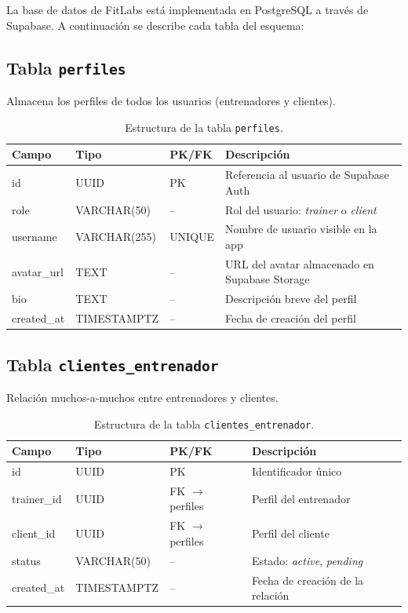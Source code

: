 La base de datos de FitLabs está implementada en PostgreSQL a través de Supabase. A continuación se describe cada tabla del esquema:

\subsection{Tabla \texttt{perfiles}}

Almacena los perfiles de todos los usuarios (entrenadores y clientes).

\begin{table}[H]
\centering
\begin{tabular}{@{}llll@{}}
\toprule
\textbf{Campo} & \textbf{Tipo} & \textbf{PK/FK} & \textbf{Descripción} \\
\midrule
id & UUID & PK & Referencia al usuario de Supabase Auth \\
role & VARCHAR(50) & -- & Rol del usuario: \textit{trainer} o \textit{client} \\
username & VARCHAR(255) & UNIQUE & Nombre de usuario visible en la app \\
avatar\_url & TEXT & -- & URL del avatar almacenado en Supabase Storage \\
bio & TEXT & -- & Descripción breve del perfil \\
created\_at & TIMESTAMPTZ & -- & Fecha de creación del perfil \\
\bottomrule
\end{tabular}
\caption{Estructura de la tabla \texttt{perfiles}.}
\end{table}

\subsection{Tabla \texttt{clientes\_entrenador}}

Relación muchos-a-muchos entre entrenadores y clientes.

\begin{table}[H]
\centering
\begin{tabular}{@{}llll@{}}
\toprule
\textbf{Campo} & \textbf{Tipo} & \textbf{PK/FK} & \textbf{Descripción} \\
\midrule
id & UUID & PK & Identificador único \\
trainer\_id & UUID & FK $\to$ perfiles & Perfil del entrenador \\
client\_id & UUID & FK $\to$ perfiles & Perfil del cliente \\
status & VARCHAR(50) & -- & Estado: \textit{active}, \textit{pending} \\
created\_at & TIMESTAMPTZ & -- & Fecha de creación de la relación \\
\bottomrule
\end{tabular}
\caption{Estructura de la tabla \texttt{clientes\_entrenador}.}
\end{table}

